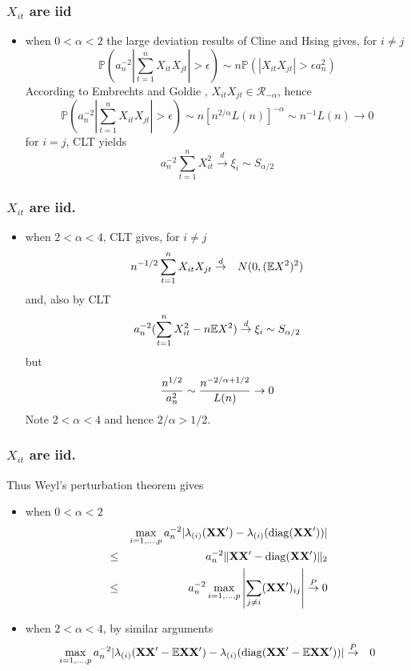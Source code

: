 \documentclass{beamer}
\renewcommand{\P}{
\mathbb P
}
\begin{document}
\begin{frame}
  \frametitle{$X_{it}$ are iid}
  \begin{itemize}
  \item when $0 < \alpha  < 2$ the large deviation results of Cline
    and Hsing \cite{cline:hsing:1998} gives, for $i \neq j$
    \[
    \P(a_n^{-2} |\sum_{t=1}^n X_{it}X_{jt}| > \epsilon) \sim n
    \P(|X_{it}X_{jt}| > \epsilon a_n^2)
    \]
    According to Embrechts and Goldie \cite{Embrechts1982263},
    $X_{it}X_{jt} \in \mathcal R_{-\alpha}$, hence
    \[
    \P(a_n^{-2} |\sum_{t=1}^n X_{it}X_{jt}| > \epsilon) \sim n
    [n^{2/\alpha} L(n)]^{-\alpha} \sim n^{-1} L(n) \to 0
    \]
    for $i = j$, CLT yields
    \[
    a_n^{-2} \sum_{t=1}^n X_{it}^2 \overset{d}{\to} \xi_i \sim S_{\alpha/2}
    \]
  \end{itemize}
\end{frame}

\begin{frame}
  \frametitle{$X_{it}$ are iid.}
  \begin{itemize}
  \item when $2 < \alpha < 4$, CLT gives, for $i \neq j$
    \begin{eqnarray*}
      n^{-1/2} \sum_{t=1}^n X_{it}X_{jt} &\overset{d}{\to}& N(0, (\mathbb{E} X^2)^2)
    \end{eqnarray*}
    and, also by CLT
    \[
    a_n^{-2}(\sum_{t=1}^n X_{it}^2 - n \mathbb{E} X^2) \overset{d}{\to} \xi_i
    \sim S_{\alpha/2}
    \]
    but
    \[
    {n^{1/2} \over a_n^2} \sim {n^{-2/\alpha + 1/2} \over L(n)} \to 0
    \]
    Note $2 < \alpha < 4$ and hence $2/\alpha > 1/2$.
  \end{itemize}
\end{frame}

\begin{frame}
  \frametitle{$X_{it}$ are iid.}
  Thus Weyl's perturbation theorem gives
  \begin{itemize}
  \item when $0 < \alpha < 2$
    \begin{eqnarray*}
    && \max_{i=1,\dots,p} a_n^{-2} |\lambda_{(i)}(\mathbf{XX'}) - \lambda_{(i)}(\operatorname{diag}(\mathbf{XX'}))| \\
    &\leq& a_n^{-2} \|\mathbf{XX'} - \operatorname{diag}(\mathbf{XX'})\|_2 \\
    &\leq& a_n^{-2} \max_{i=1,\dots,p} \left|\sum_{j\neq i} (\mathbf{XX'})_{ij}\right|
    \overset{P}{\to} 0
    \end{eqnarray*}
  \item when $2 < \alpha < 4$, by similar arguments
    \begin{eqnarray*}
      \max_{i=1,\dots,p} a_n^{-2} |\lambda_{(i)}(\mathbf{XX'} - \mathbb{E} \mathbf{XX'}) -
      \lambda_{(i)}(\operatorname{diag}(\mathbf{XX'} - \mathbb{E} \mathbf{XX'}))|
      &\overset{P}{\to}& 0
    \end{eqnarray*}
  \end{itemize}
\end{frame}
\end{document}
